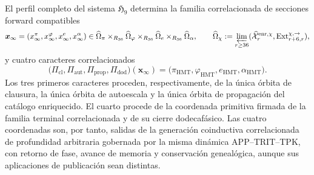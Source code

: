 \begin{theorem}
\label{thm:c27-cuadrirrelacion-generada}
El perfil completo del sistema \(\mathfrak H_9\) determina la familia
correlacionada de secciones forward compatibles
\[
 \boldsymbol x_\infty=
 (x_\infty^\pi,x_\infty^\varphi,x_\infty^e,x_\infty^\alpha)
 \in
 \widehat\Omega_\pi\times_{R_{36}}
 \widehat\Omega_\varphi\times_{R_{36}}
 \widehat\Omega_e\times_{R_{36}}\widehat\Omega_\alpha,
 \qquad
 \widehat\Omega_\chi:=
 \varprojlim_{r\ge36}
 (\widehat{\mathcal X}^{\mathrm{enr},\chi}_r,
  \operatorname{Ext}^{\chi,\rightarrow}_{r+6,r}),
\]
y cuatro caracteres correlacionados
\[
 \bigl(\Pi_{\mathrm{cl}},\Pi_{\mathrm{aut}},
       \Pi_{\mathrm{prop}},\Pi_{\mathrm{dod}}\bigr)
       (\boldsymbol x_\infty)
 =\bigl(\pi_{\mathrm{HMT}},\varphi_{\mathrm{HMT}},
        e_{\mathrm{HMT}},\alpha_{\mathrm{HMT}}\bigr).
\]
Los tres primeros caracteres proceden, respectivamente, de la única
órbita de clausura, la única órbita de autoescala y la única
órbita de propagación del catálogo enriquecido. El cuarto procede de la
coordenada primitiva firmada de la familia terminal correlacionada y de su
cierre dodecafásico. Las cuatro coordenadas son, por tanto, salidas de la
generación coinductiva correlacionada de profundidad arbitraria gobernada por
la misma dinámica APP--TRIT--TPK, con retorno de fase, avance de memoria y
conservación genealógica, aunque sus aplicaciones de publicación sean
distintas.
\end{theorem}

